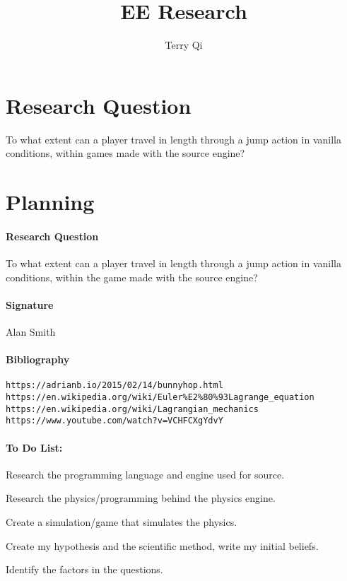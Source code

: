 \documentclass[a4paper,12pt]{article}
\title{EE Research}
\author{Terry Qi}
\begin{document}
\maketitle
\newpage

\section{Research Question}

To what extent can a player travel in length through a jump action in vanilla conditions, within games made with the source engine?

\section{Planning}

\paragraph{Research Question} To what extent can a player travel in length through a jump action in vanilla conditions, within the game made with the source engine?

\paragraph{Signature} Alan Smith

\paragraph{Bibliography}
\begin{verbatim}
https://adrianb.io/2015/02/14/bunnyhop.html
https://en.wikipedia.org/wiki/Euler%E2%80%93Lagrange_equation
https://en.wikipedia.org/wiki/Lagrangian_mechanics
https://www.youtube.com/watch?v=VCHFCXgYdvY
\end{verbatim}

\paragraph{To Do List:}
Research the programming language and engine used for source.

Research the physics/programming behind the physics engine.

Create a simulation/game that simulates the physics.

Create my hypothesis and the scientific method, write my initial beliefs.

Identify the factors in the questions.
\end{document}

